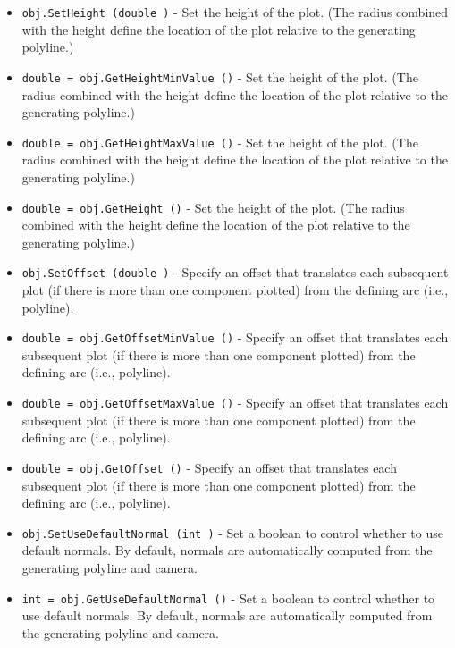 \begin{itemize}
\item  \verb|obj.SetHeight (double )| -  Set the height of the plot. (The radius combined with the height
 define the location of the plot relative to the generating polyline.)

\item  \verb|double = obj.GetHeightMinValue ()| -  Set the height of the plot. (The radius combined with the height
 define the location of the plot relative to the generating polyline.)

\item  \verb|double = obj.GetHeightMaxValue ()| -  Set the height of the plot. (The radius combined with the height
 define the location of the plot relative to the generating polyline.)

\item  \verb|double = obj.GetHeight ()| -  Set the height of the plot. (The radius combined with the height
 define the location of the plot relative to the generating polyline.)

\item  \verb|obj.SetOffset (double )| -  Specify an offset that translates each subsequent plot (if there is
 more than one component plotted) from the defining arc (i.e., polyline).

\item  \verb|double = obj.GetOffsetMinValue ()| -  Specify an offset that translates each subsequent plot (if there is
 more than one component plotted) from the defining arc (i.e., polyline).

\item  \verb|double = obj.GetOffsetMaxValue ()| -  Specify an offset that translates each subsequent plot (if there is
 more than one component plotted) from the defining arc (i.e., polyline).

\item  \verb|double = obj.GetOffset ()| -  Specify an offset that translates each subsequent plot (if there is
 more than one component plotted) from the defining arc (i.e., polyline).

\item  \verb|obj.SetUseDefaultNormal (int )| -  Set a boolean to control whether to use default normals.
 By default, normals are automatically computed from the generating
 polyline and camera.

\item  \verb|int = obj.GetUseDefaultNormal ()| -  Set a boolean to control whether to use default normals.
 By default, normals are automatically computed from the generating
 polyline and camera.


\end{itemize}
